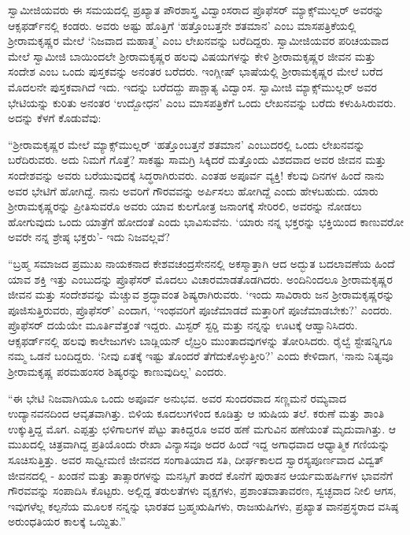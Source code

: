 ಸ್ವಾಮೀಜಿಯವರು ಈ ಸಮಯದಲ್ಲಿ ಪ್ರಖ್ಯಾತ ಪೌರಶಾಸ್ತ್ರ ವಿದ್ವಾಂಸರಾದ ಪ್ರೊಫೆಸರ್ ಮ್ಯಾಕ್ಸ್‌ಮುಲ್ಲರ್ ಅವರನ್ನು ಆಕ್ಸ‍ಫರ್ಡ್‍ನಲ್ಲಿ ಕಂಡರು. ಅವರು ಅಷ್ಟು ಹೊತ್ತಿಗೆ ‘ಹತ್ತೊಂಬತ್ತನೇ ಶತಮಾನ’ ಎಂಬ ಮಾಸಪತ್ರಿಕೆಯಲ್ಲಿ ಶ‍್ರೀರಾಮಕೃಷ್ಣರ ಮೇಲೆ ‘ನಿಜವಾದ ಮಹಾತ್ಮ’ ಎಂಬ ಲೇಖನವನ್ನು ಬರೆದಿದ್ದರು. ಸ್ವಾಮೀಜಿಯವರ ಪರಿಚಯವಾದ ಮೇಲೆ ಸ್ವಾಮೀಜಿ ಬಾಯಿಂದಲೇ ಶ‍್ರೀರಾಮಕೃಷ್ಣರ ಹಲವು ವಿಷಯಗಳನ್ನು ಕೇಳಿ ಶ‍್ರೀರಾಮಕೃಷ್ಣರ ಜೀವನ ಮತ್ತು ಸಂದೇಶ ಎಂಬ ಒಂದು ಪುಸ್ತಕವನ್ನು ಅನಂತರ ಬರೆದರು. ಇಂಗ್ಲೀಷ್ ಭಾಷೆಯಲ್ಲಿ ಶ‍್ರೀರಾಮಕೃಷ್ಣರ ಮೇಲೆ ಬರೆದ ಮೊದಲನೇ ಪುಸ್ತಕವಾಗಿದೆ ಇದು. ಇದನ್ನು ಬರೆದದ್ದು ಪಾಶ್ಚಾತ್ಯ ವಿದ್ವಾಂಸ. ಸ್ವಾಮೀಜಿ ಮ್ಯಾಕ್ಸ್‌ಮುಲ್ಲರ್ ಅವರ ಭೇಟಿಯನ್ನು ಕುರಿತು ಅನಂತರ ‘ಉದ್ಬೋಧನ’ ಎಂಬ ಮಾಸಪತ್ರಿಕೆಗೆ ಒಂದು ಲೇಖನವನ್ನು ಬರೆದು ಕಳುಹಿಸಿರುವರು. ಅದನ್ನು ಕೆಳಗೆ ಕೊಡುವೆವು: 

 “ಶ‍್ರೀರಾಮಕೃಷ್ಣರ ಮೇಲೆ ಮ್ಯಾಕ್ಸ್‌ಮುಲ್ಲರ್ ‘ಹತ್ತೊಂಬತ್ತನೆ ಶತಮಾನ’ ಎಂಬುದರಲ್ಲಿ ಒಂದು ಲೇಖನವನ್ನು ಬರೆದಿರುವರು. ಅದು ನಿಮಗೆ ಗೊತ್ತೆ? ಸಾಕಷ್ಟು ಸಾಮಗ್ರಿ ಸಿಕ್ಕಿದರೆ ಮತ್ತೊಂದು ವಿಶದವಾದ ಅವರ ಜೀವನ ಮತ್ತು ಸಂದೇಶವನ್ನು ಅವರು ಬರೆಯುವುದಕ್ಕೆ ಸಿದ್ಧರಾಗಿರುವರು. ಎಂತಹ ಅಪೂರ್ವ ವ್ಯಕ್ತಿ! ಕೆಲವು ದಿನಗಳ ಹಿಂದೆ ನಾನು ಅವರ ಭೇಟಿಗೆ ಹೋಗಿದ್ದೆ. ನಾನು ಅವರಿಗೆ ಗೌರವವನ್ನು ಅರ್ಪಿಸಲು ಹೋಗಿದ್ದೆ ಎಂದು ಹೇಳಬಹುದು. ಯಾರು ಶ‍್ರೀರಾಮಕೃಷ್ಣರನ್ನು ಪ್ರೀತಿಸುವರೊ ಅವರು ಯಾವ ಕುಲಗೋತ್ರ ಜನಾಂಗಕ್ಕೆ ಸೇರಿರಲಿ, ಅವರನ್ನು ನೋಡಲು ಹೋಗುವುದು ಒಂದು ಯಾತ್ರೆಗೆ ಹೋದಂತೆ ಎಂದು ಭಾವಿಸುವೆನು. ‘ಯಾರು ನನ್ನ ಭಕ್ತರನ್ನು ಭಕ್ತಿಯಿಂದ ಕಾಣುವರೋ ಅವರೇ ನನ್ನ ಶ್ರೇಷ್ಠ ಭಕ್ತರು’- ಇದು ನಿಜವಲ್ಲವೆ? 

 “ಬ್ರಹ್ಮ ಸಮಾಜದ ಪ್ರಮುಖ ನಾಯಕನಾದ ಕೇಶವಚಂದ್ರಸೇನನಲ್ಲಿ ಅಕಸ್ಮಾತ್ತಾಗಿ ಆದ ಅದ್ಭುತ ಬದಲಾವಣೆಯ ಹಿಂದೆ ಯಾವ ಶಕ್ತಿ ಇತ್ತು ಎಂಬುದನ್ನು ಪ್ರೊಫೆಸರ್ ಮೊದಲು ವಿಚಾರಮಾಡತೊಡಗಿದರು. ಅಂದಿನಿಂದಲೂ ಶ‍್ರೀರಾಮಕೃಷ್ಣರ ಜೀವನ ಮತ್ತು ಸಂದೇಶವನ್ನು ಮೆಚ್ಚುವ ಶ್ರದ್ಧಾವಂತ ಶಿಷ್ಯರಾಗಿರುವರು. ‘ಇಂದು ಸಾವಿರಾರು ಜನ ಶ‍್ರೀರಾಮಕೃಷ್ಣರನ್ನು ಪೂಜಿಸುತ್ತಿರುವರು, ಪ್ರೊಫೆಸರ್’ ಎಂದಾಗ, ‘ಇಂಥವರಿಗೆ ಪೂಜೆಮಾಡದೆ ಮತ್ತಾರಿಗೆ ಪೂಜೆಮಾಡಬೇಕು?’ ಎಂದರು. ಪ್ರೊಫೆಸರ್ ದಯೆಯೇ ಮೂರ್ತಿವೆತ್ತಂತೆ ಇದ್ದರು. ಮಿಸ್ಟರ್ ಸ್ಟರ‍್ಡಿ ಮತ್ತು ನನ್ನನ್ನು ಊಟಕ್ಕೆ ಆಹ್ವಾನಿಸಿದರು. ಆಕ್ಸ‍ಫರ್ಡ್‍ನಲ್ಲಿ ಹಲವು ಕಾಲೇಜುಗಳು ಬಾಡ್ಲಿಯನ್ ಲೈಬ್ರರಿ ಮುಂತಾದವುಗಳನ್ನು ತೋರಿಸಿದರು. ರೈಲ್ವೆ ಸ್ಟೇಷನ್ನಿಗೂ ನಮ್ಮ ಒಡನೆ ಬಂದಿದ್ದರು. ‘ನೀವು ಏತಕ್ಕೆ ಇಷ್ಟು ತೊಂದರೆ ತೆಗೆದುಕೊಳ್ಳುತ್ತೀರಿ?’ ಎಂದು ಕೇಳಿದಾಗ, ‘ನಾನು ನಿತ್ಯವೂ ಶ‍್ರೀರಾಮಕೃಷ್ಣ ಪರಮಹಂಸರ ಶಿಷ್ಯರನ್ನು ಕಾಣುವುದಿಲ್ಲ’ ಎಂದರು. 

 “ಈ ಭೇಟಿ ನಿಜವಾಗಿಯೂ ಒಂದು ಅಪೂರ್ವ ಅನುಭವ. ಅವರ ಸುಂದರವಾದ ಸಣ್ಣಮನೆ ರಮ್ಯವಾದ ಉದ್ಯಾನವನದಿಂದ ಆವೃತವಾಗಿತ್ತು. ಬಿಳಿಯ ಕೂದಲುಗಳಿಂದ ಕೂಡಿತ್ತು ಆ ಋಷಿಯ ತಲೆ. ಕರುಣೆ ಮತ್ತು ಶಾಂತಿ ಉಕ್ಕುತ್ತಿದ್ದ ಮೊಗ. ಎಪ್ಪತ್ತು ಛಳಿಗಾಲಗಳ ಪೆಟ್ಟು ತಾಕಿದ್ದರೂ ಅವರ ಹಣೆ ಮಗುವಿನ ಹಣೆಯಂತೆ ಮೃದುವಾಗಿತ್ತು. ಆ ಮುಖದಲ್ಲಿ ಚಿತ್ರವಾಗಿದ್ದ ಪ್ರತಿಯೊಂದು ರೇಖಾ ವಿನ್ಯಾಸವೂ ಅದರ ಹಿಂದೆ ಇದ್ದ ಅಗಾಧವಾದ ಆಧ್ಯಾತ್ಮಿಕ ಗಣಿಯನ್ನು ಸೂಚಿಸುತ್ತಿತ್ತು. ಅವರ ಸಾಧ್ವೀಮಣಿ ಜೀವನದ ಸಂಗಾತಿಯಾದ ಸತಿ, ದೀರ್ಘಕಾಲದ ಸ್ವಾರಸ್ಯಪೂರ್ಣವಾದ ವಿದ್ವತ್ ಜೀವನದಲ್ಲಿ - ಖಂಡನೆ ಮತ್ತು ತಾತ್ಸಾರಗಳನ್ನು ಮನಸ್ಸಿಗೆ ತಾರದೆ ಕೊನೆಗೆ ಪುರಾತನ ಆರ್ಯಮಹರ್ಷಿಗಳ ಭಾವನೆಗೆ ಗೌರವವನ್ನು ಸಂಪಾದಿಸಿ ಕೊಟ್ಟರು. ಅಲ್ಲಿದ್ದ ತರುಲತೆಗಳು ವೃಕ್ಷಗಳು, ಪ್ರಶಾಂತವಾತಾವರಣ, ಸ್ವಚ್ಛವಾದ ನೀಲಿ ಆಗಸ, ಇವುಗಳೆಲ್ಲ ಕಲ್ಪನೆಯ ಮೂಲಕ ನನ್ನನ್ನು ಭಾರತದ ಬ್ರಹ್ಮಋಷಿಗಳು, ರಾಜಋಷಿಗಳು, ಪ್ರಖ್ಯಾತ ವಾನಪ್ರಸ್ಥರಾದ ವಸಿಷ್ಠ ಅರುಂಧತಿಯರ ಕಾಲಕ್ಕೆ ಒಯ್ದಿತು.” 

